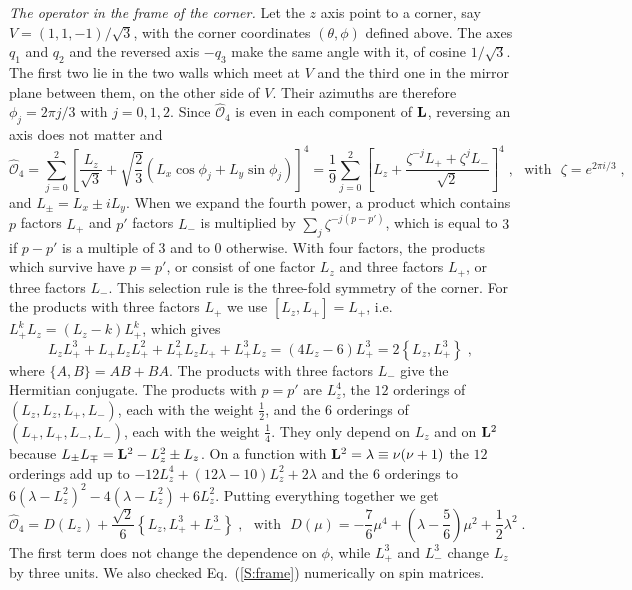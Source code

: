 \emph{The operator in the frame of the corner.} Let the $z$ axis point to a corner, say $V = (1, 1, -1)/\sqrt{3}$, with the corner coordinates $(\theta, \phi)$ defined above. The axes $q_1$ and $q_2$ and the reversed axis $-q_3$ make the same angle with it, of cosine $1/\sqrt{3}$. The first two lie in the two walls which meet at $V$ and the third one in the mirror plane between them, on the other side of $V$. Their azimuths are therefore $\phi_j = 2 \pi j/3$ with $j = 0, 1, 2$. Since $\hat{\mathcal{O}}_4$ is even in each component of $\vb{L}$, reversing an axis does not matter and
\begin{equation} \label{S:axes}
    \hat{\mathcal{O}}_4 = \sum_{j = 0}^{2} \left[ \frac{L_z}{\sqrt{3}} + \sqrt{\frac{2}{3}} \left( L_x \cos \phi_j + L_y \sin \phi_j \right) \right]^4 = \frac{1}{9} \sum_{j = 0}^{2} \left[ L_z + \frac{\zeta^{-j} L_+ + \zeta^{j} L_-}{\sqrt{2}} \right]^4 \;, \mbox{~~with~~} \zeta = e^{2 \pi i/3} \;,
\end{equation}
and $L_\pm = L_x \pm i L_y$. When we expand the fourth power, a product which contains $p$ factors $L_+$ and $p'$ factors $L_-$ is multiplied by $\sum_j \zeta^{-j(p - p')}$, which is equal to $3$ if $p - p'$ is a multiple of $3$ and to $0$ otherwise. With four factors, the products which survive have $p = p'$, or consist of one factor $L_z$ and three factors $L_+$, or three factors $L_-$. This selection rule is the three-fold symmetry of the corner. For the products with three factors $L_+$ we use $[L_z, L_+] = L_+$, i.e. $L_+^k L_z = (L_z - k) L_+^k$, which gives
\begin{equation} \label{S:four}
    L_z L_+^3 + L_+ L_z L_+^2 + L_+^2 L_z L_+ + L_+^3 L_z = \left( 4 L_z - 6 \right) L_+^3 = 2 \left\{ L_z, L_+^3 \right\} \;,
\end{equation}
where $\{A, B\} = AB + BA$. The products with three factors $L_-$ give the Hermitian conjugate. The products with $p = p'$ are $L_z^4$, the $12$ orderings of $(L_z, L_z, L_+, L_-)$, each with the weight $\frac{1}{2}$, and the $6$ orderings of $(L_+, L_+, L_-, L_-)$, each with the weight $\frac{1}{4}$. They only depend on $L_z$ and on $\vb{L}^2$ because $L_\pm L_\mp = \vb{L}^2 - L_z^2 \pm L_z$. On a function with $\vb{L}^2 = \lambda \equiv \nu(\nu+1)$ the $12$ orderings add up to $-12 L_z^4 + (12 \lambda - 10) L_z^2 + 2 \lambda$ and the $6$ orderings to $6 (\lambda - L_z^2)^2 - 4 (\lambda - L_z^2) + 6 L_z^2$. Putting everything together we get
\begin{equation} \label{S:frame}
    \hat{\mathcal{O}}_4 = D(L_z) + \frac{\sqrt{2}}{6} \left\{ L_z, L_+^3 + L_-^3 \right\} \;, \mbox{~~with~~} D(\mu) = - \frac{7}{6} \mu^4 + \left( \lambda - \frac{5}{6} \right) \mu^2 + \frac{1}{2} \lambda^2 \;.
\end{equation}
The first term does not change the dependence on $\phi$, while $L_+^3$ and $L_-^3$ change $L_z$ by three units. We also checked Eq.~(\ref{S:frame}) numerically on spin matrices.

